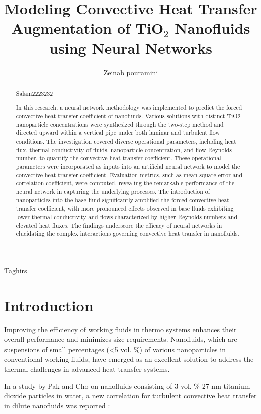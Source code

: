 \documentclass{article}
\title{Modeling Convective Heat Transfer Augmentation of TiO$_2$ Nanofluids using Neural Networks}
\author{Zeinab pouramini}
\date{}
\begin{document}
\maketitle

\begin{abstract}
	Salam2223232
	
	
In this research, a neural network methodology was implemented to predict the forced convective heat transfer coefficient of nanofluids. Various solutions with distinct TiO2 nanoparticle concentrations were synthesized through the two-step method and directed upward within a vertical pipe under both laminar and turbulent flow conditions. The investigation covered diverse operational parameters, including heat flux, thermal conductivity of fluids, nanoparticle concentration, and flow Reynolds number, to quantify the convective heat transfer coefficient. These operational parameters were incorporated as inputs into an artificial neural network to model the convective heat transfer coefficient. Evaluation metrics, such as mean square error and correlation coefficient, were computed, revealing the remarkable performance of the neural network in capturing the underlying processes. The introduction of nanoparticles into the base fluid significantly amplified the forced convective heat transfer coefficient, with more pronounced effects observed in base fluids exhibiting lower thermal conductivity and flows characterized by higher Reynolds numbers and elevated heat fluxes. The findings underscore the efficacy of neural networks in elucidating the complex interactions governing convective heat transfer in nanofluids.
\end{abstract}


Taghirs

\section{Introduction}
Improving the efficiency of working fluids in thermo systems enhances their overall performance and minimizes size requirements. Nanofluids, which are suspensions of small percentages (<5 vol.  \%) of various nanoparticles in conventional working fluids, have emerged as an excellent solution to address the thermal challenges in advanced heat transfer systems.

In a study by Pak and Cho on nanofluids consisting of 3 vol.  \% 27 nm titanium dioxide particles in water, a new correlation for turbulent convective heat transfer in dilute nanofluids was reported \cite{ref1}:
\end{document}
